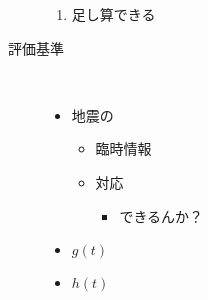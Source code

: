 \documentclass[paper=a4,fontsize=10.5pt]{jlreq}
\begin{document}
\begin{description}
\begin{enumerate}
            \item 足し算できる
        \end{enumerate}
        \item[評価基準]\
        \begin{itemize}
            \item 地震の
                  \begin{itemize}
                      \item 臨時情報
                      \item 対応
                            \begin{itemize}
                                \item できるんか？
                            \end{itemize}
                  \end{itemize}
            \item \(g(t)\)
            \item \(h(t)\)
        \end{itemize}
\end{description}
\newpage
\fontsize{10pt}{0cm}\selectfont
\end{document}
